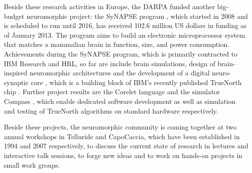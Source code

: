 Beside these research activities in Europe, the \ac{DARPA} funded another big-budget neuromorphic project: the \ac{SyNAPSE} program \cite{SYNAPSE-proj, Srinivasa2012}, which started in 2008 and is scheduled to run until 2016, has received 102.6 million US dollars in funding as of January 2013.
The program aims to build an electronic microprocessor system that matches a mammalian brain in function, size, and power consumption.
Achievements during the \ac{SyNAPSE} program, which is primarily contracted to IBM Research and \acs{HRL}, so far are include brain simulations, design of brain-inspired neuromorphic architectures \cite{Nere2012} and the development of a digital neuro-synaptic core \cite{Merolla2011}, which is a building block of IBM's recently published TrueNorth chip \cite{Akopyan2015}.
Further project results are the Corelet language \cite{Amir2013} and the simulator Compass \cite{Preissl2012}, which enable dedicated software development as well as simulation and testing of TrueNorth algorithms on standard hardware respectively.

Beside these projects, the neuromorphic community is coming together at two annual  workshops in Telluride and CapoCaccia, which have been established in 1994 and 2007 respectively, to discuss the current state of research in lectures and interactive talk sessions, to forge new ideas and to work on hands-on projects in small work groups.

